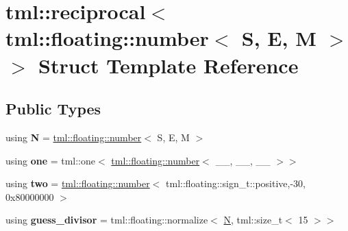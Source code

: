 \hypertarget{structtml_1_1reciprocal_3_01tml_1_1floating_1_1number_3_01_s_00_01_e_00_01_m_01_4_01_4}{\section{tml\+:\+:reciprocal$<$ tml\+:\+:floating\+:\+:number$<$ S, E, M $>$ $>$ Struct Template Reference}
\label{structtml_1_1reciprocal_3_01tml_1_1floating_1_1number_3_01_s_00_01_e_00_01_m_01_4_01_4}
}
\subsection*{Public Types}
\begin{DoxyCompactItemize}
\item 
\hypertarget{structtml_1_1reciprocal_3_01tml_1_1floating_1_1number_3_01_s_00_01_e_00_01_m_01_4_01_4_ad36a3d65efbcc494e1e47971265a870c}{using {\bfseries N} = \hyperlink{structtml_1_1floating_1_1number}{tml\+::floating\+::number}$<$ S, E, M $>$}\label{structtml_1_1reciprocal_3_01tml_1_1floating_1_1number_3_01_s_00_01_e_00_01_m_01_4_01_4_ad36a3d65efbcc494e1e47971265a870c}

\item 
\hypertarget{structtml_1_1reciprocal_3_01tml_1_1floating_1_1number_3_01_s_00_01_e_00_01_m_01_4_01_4_a4c4b6d15a07322bd2aff7c539e42bcee}{using {\bfseries one} = tml\+::one$<$ \hyperlink{structtml_1_1floating_1_1number}{tml\+::floating\+::number}$<$ \+\_\+\+\_\+, \+\_\+\+\_\+, \+\_\+\+\_\+ $>$$>$}\label{structtml_1_1reciprocal_3_01tml_1_1floating_1_1number_3_01_s_00_01_e_00_01_m_01_4_01_4_a4c4b6d15a07322bd2aff7c539e42bcee}

\item 
\hypertarget{structtml_1_1reciprocal_3_01tml_1_1floating_1_1number_3_01_s_00_01_e_00_01_m_01_4_01_4_a3b51f18ae825c70babf4e9fb6cf0e75f}{using {\bfseries two} = \hyperlink{structtml_1_1floating_1_1number}{tml\+::floating\+::number}$<$ tml\+::floating\+::sign\+\_\+t\+::positive,-\/30, 0x80000000 $>$}\label{structtml_1_1reciprocal_3_01tml_1_1floating_1_1number_3_01_s_00_01_e_00_01_m_01_4_01_4_a3b51f18ae825c70babf4e9fb6cf0e75f}

\item 
\hypertarget{structtml_1_1reciprocal_3_01tml_1_1floating_1_1number_3_01_s_00_01_e_00_01_m_01_4_01_4_a58b15d0438fef83616e4f9f16f88b87b}{using {\bfseries guess\+\_\+divisor} = tml\+::floating\+::normalize$<$ \hyperlink{structtml_1_1floating_1_1number}{N}, tml\+::size\+\_\+t$<$ 15 $>$$>$}\label{structtml_1_1reciprocal_3_01tml_1_1floating_1_1number_3_01_s_00_01_e_00_01_m_01_4_01_4_a58b15d0438fef83616e4f9f16f88b87b}


\end{DoxyCompactItemize}
